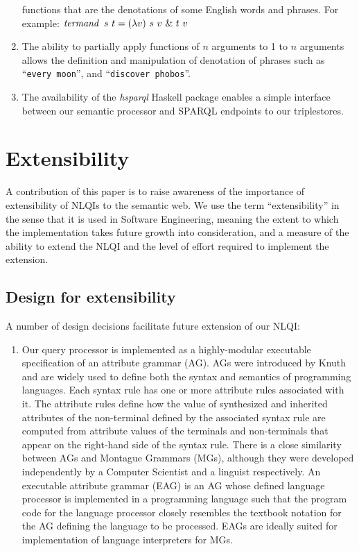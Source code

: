 \documentclass[../main.tex]{subfiles}
\begin{document}
\begin{refsection}
\begin{enumerate}
	functions that are the denotations of some English words and phrases. For example: $ \opit{termand}\ s\ t = (\lambda v)\ s\ v\ \&\ t\ v  $
	\item The ability to partially apply functions of $n$ arguments to 1 to $n$ arguments allows the
	definition and manipulation of denotation of phrases such as ``\texttt{every moon}'', and ``\texttt{discover
	phobos}''.
	\item The availability of the \textit{hsparql} \cite{hsparql} Haskell package enables a simple interface between our
	semantic processor and SPARQL endpoints to our triplestores.
\end{enumerate}

\section{Extensibility}
\label{ext:extensible}

A contribution of this paper is to raise awareness of the importance of extensibility of NLQIs to
the semantic web. We use the term ``extensibility'' in the sense that it is used in Software Engineering,
meaning the extent to which the implementation takes future growth into consideration, and a
measure of the ability to extend the NLQI and the level of effort required to implement the extension.


\subsection{Design for extensibility}

A number of design decisions facilitate future extension of our NLQI:

\begin{enumerate}
	\item Our query processor is implemented as a highly-modular executable specification of an attribute grammar (AG). AGs were introduced by Knuth \cite{knuth1968semantics} and are
	widely used to define both the syntax and semantics of programming languages. Each syntax
	rule has one or more attribute rules associated with it. The attribute rules define how the value
	of synthesized and inherited attributes of the non-terminal defined by the
	associated syntax rule are computed from attribute values of the terminals and non-terminals
	that appear on the right-hand side of the syntax rule. There is a close similarity between AGs
	and Montague Grammars (MGs), although they were developed independently by a Computer
	Scientist and a linguist respectively. An executable attribute grammar (EAG) is an AG whose
	defined language processor is implemented in a programming language such that the program
	code for the language processor closely resembles the textbook notation for the AG defining
	the language to be processed. EAGs are ideally suited for
	implementation of language interpreters for MGs.


\end{enumerate}
\end{refsection}
\end{document}
